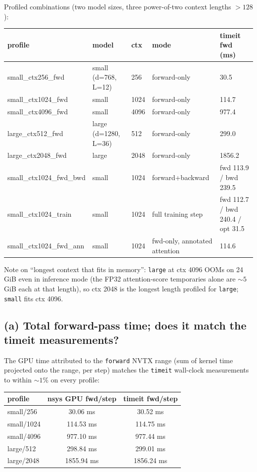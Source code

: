 \documentclass[11pt]{article}
\newcommand{\code}[1]{\texttt{#1}}
\begin{document}
Profiled combinations (two model sizes, three power-of-two context lengths $>128$):

\begin{center}\small
\begin{tabular}{lllll}
\toprule
profile & model & ctx & mode & timeit fwd (ms) \\
\midrule
small\_ctx256\_fwd      & small (d=768, L=12) & 256  & forward-only & 30.5 \\
small\_ctx1024\_fwd     & small & 1024 & forward-only & 114.7 \\
small\_ctx4096\_fwd     & small & 4096 & forward-only & 977.4 \\
large\_ctx512\_fwd      & large (d=1280, L=36) & 512 & forward-only & 299.0 \\
large\_ctx2048\_fwd     & large & 2048 & forward-only & 1856.2 \\
small\_ctx1024\_fwd\_bwd & small & 1024 & forward+backward & fwd 113.9 / bwd 239.5 \\
small\_ctx1024\_train   & small & 1024 & full training step & fwd 112.7 / bwd 240.4 / opt 31.5 \\
small\_ctx1024\_fwd\_ann & small & 1024 & fwd-only, annotated attention & 114.6 \\
\bottomrule
\end{tabular}
\end{center}

Note on ``longest context that fits in memory'': \code{large} at ctx 4096 OOMs on 24 GiB even in
inference mode (the FP32 attention-score temporaries alone are ${\sim}5$ GiB each at that length), so
ctx 2048 is the longest length profiled for \code{large}; \code{small} fits ctx 4096.

\subsection{(a) Total forward-pass time; does it match the timeit measurements?}

The GPU time attributed to the \code{forward} NVTX range (sum of kernel time projected onto the
range, per step) matches the \code{timeit} wall-clock measurements to within ${\sim}1\%$ on every
profile:

\begin{center}
\begin{tabular}{lcc}
\toprule
profile & nsys GPU fwd/step & timeit fwd/step \\
\midrule
small/256  & 30.06 ms   & 30.52 ms \\
small/1024 & 114.53 ms  & 114.75 ms \\
small/4096 & 977.10 ms  & 977.44 ms \\
large/512  & 298.84 ms  & 299.01 ms \\
large/2048 & 1855.94 ms & 1856.24 ms \\
\bottomrule
\end{tabular}
\end{center}
\end{document}
